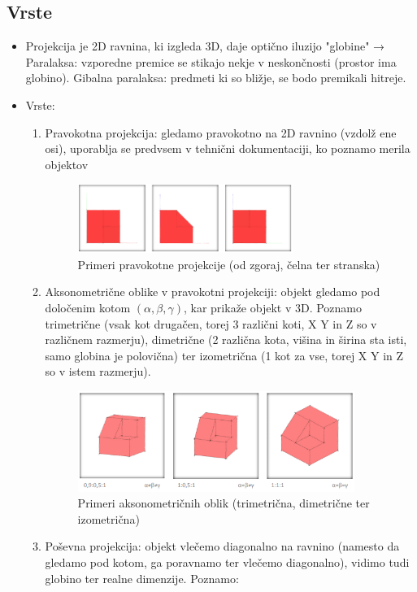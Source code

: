 \documentclass{article}
\begin{document}
\subsection{Vrste}
\begin{itemize}
    \item Projekcija je 2D ravnina, ki izgleda 3D, daje optično iluzijo "globine" → Paralaksa: vzporedne premice se stikajo nekje v neskončnosti (prostor ima globino). Gibalna paralaksa: predmeti ki so bližje, se bodo premikali hitreje. 
    \item Vrste:
    \begin{enumerate}
        \item Pravokotna projekcija: gledamo pravokotno na 2D ravnino (vzdolž ene osi), uporablja se predvsem v tehnični dokumentaciji, ko poznamo merila objektov
        \begin{figure}[H]
        \centering
        \includegraphics[width=70mm]{src/pravokotna_projekcija.png}
        \caption{Primeri pravokotne projekcije (od zgoraj, čelna ter stranska)}
        \end{figure}   
        \item Aksonometrične oblike v pravokotni projekciji: objekt gledamo pod določenim kotom $(\alpha, \beta, \gamma)$, kar prikaže objekt v 3D. Poznamo trimetrične (vsak kot drugačen, torej 3 različni koti, X Y in Z so v različnem razmerju), dimetrične (2 različna kota, višina in širina sta isti, samo globina je polovična) ter izometrična (1 kot za vse, torej X Y in Z so v istem razmerju).
        \begin{figure}[H]
        \centering
        \includegraphics[width=90mm]{src/aksonometricne_oblike.png}
        \caption{Primeri aksonometričnih oblik (trimetrična, dimetrične ter izometrična)}
        \end{figure} 
        \item Poševna projekcija: objekt vlečemo diagonalno na ravnino (namesto da gledamo pod kotom, ga poravnamo ter vlečemo diagonalno), vidimo tudi globino ter realne dimenzije. Poznamo:

\end{enumerate}
\end{itemize}
\end{document}
